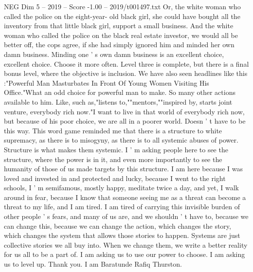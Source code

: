 \begin{textsample}{NEG Dim 5 – 2019 – Score -1.00 – 2019/t001497.txt}
Or, the white woman who called the police on the eight-year- old black girl, she could have bought all the inventory from that little black girl, support a small business.
And the white woman who called the police on the black real estate investor, we would all be better off, the cops agree, if she had simply ignored him and minded her own damn business.
Minding one ' s own damn business is an excellent choice, excellent choice.
Choose it more often.
Level three is complete, but there is a final bonus level, where the objective is inclusion.
We have also seen headlines like this :"Powerful Man Masturbates In Front Of Young Women Visiting His Office."What an odd choice for powerful man to make.
So many other actions available to him.
Like, such as,"listens to,""mentors,""inspired by, starts joint venture, everybody rich now."I want to live in that world of everybody rich now, but because of his poor choice, we are all in a poorer world.
Doesn ' t have to be this way.
This word game reminded me that there is a structure to white supremacy, as there is to misogyny, as there is to all systemic abuses of power.
Structure is what makes them systemic.
I ' m asking people here to see the structure, where the power is in it, and even more importantly to see the humanity of those of us made targets by this structure.
I am here because I was loved and invested in and protected and lucky, because I went to the right schools, I ' m semifamous, mostly happy, meditate twice a day, and yet, I walk around in fear, because I know that someone seeing me as a threat can become a threat to my life, and I am tired.
I am tired of carrying this invisible burden of other people ' s fears, and many of us are, and we shouldn ' t have to, because we can change this, because we can change the action, which changes the story, which changes the system that allows those stories to happen.
Systems are just collective stories we all buy into.
When we change them, we write a better reality for us all to be a part of.
I am asking us to use our power to choose.
I am asking us to level up.
Thank you.
I am Baratunde Rafiq Thurston.

\end{textsample}
